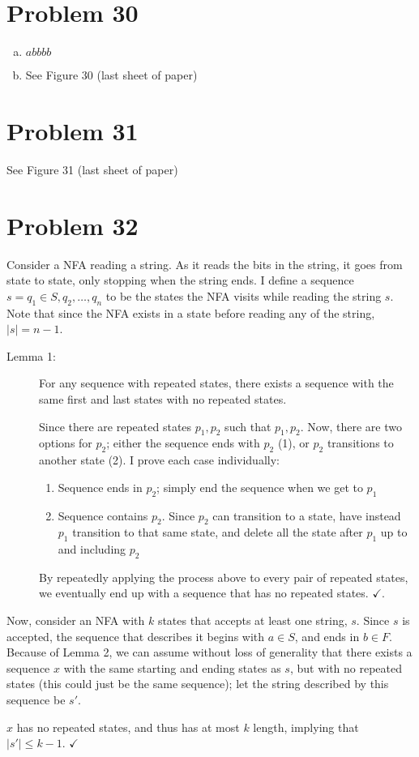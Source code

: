 \documentclass[11pt]{article}
\begin{document}
\section*{Problem 30}
\begin{enumerate}[(a)]
	\item $abbbb$
	\item See Figure 30 (last sheet of paper)
\end{enumerate}

\section*{Problem 31}
See Figure 31 (last sheet of paper)

\section*{Problem 32}
Consider a NFA reading a string. As it reads the bits in the string, it goes from state to state, only stopping when the string ends. I define a sequence $s = q_1 \in S, q_2, \dots, q_n$ to be the states the NFA visits while reading the string $s$. Note that since the NFA exists in a state before reading any of the string, $|s| = n-1$.

\begin{description}
\item[Lemma 1:]
For any sequence with repeated states, there exists a sequence with the same first and last states with no repeated states.

Since there are repeated states $p_1, p_2$ such that $p_1, p_2$. Now, there are two options for $p_2$; either the sequence ends with $p_2$ (1), or $p_2$ transitions to another state (2). I prove each case individually:
	\begin{enumerate}
		\item Sequence ends in $p_2$; simply end the sequence when we get to $p_1$
		\item Sequence contains $p_2$. Since $p_2$ can transition to a state, have instead $p_1$ transition to that same state, and delete all the state after $p_1$ up to and including $p_2$
	\end{enumerate}
	
By repeatedly applying the process above to every pair of repeated states, we eventually end up with a sequence that has no repeated states. $\checkmark$.
\end{description}

Now, consider an NFA with $k$ states that accepts at least one string, $s$. Since $s$ is accepted, the sequence that describes it begins with $a \in S$, and ends in $b \in F$. Because of Lemma 2, we can assume without loss of generality that there exists a sequence $x$ with the same starting and ending states as $s$, but with no repeated states (this could just be the same sequence); let the string described by this sequence be $s'$. 

$x$ has no repeated states, and thus has at most $k$ length, implying that $|s'| \leq k -1$. $\checkmark$
\end{document}
